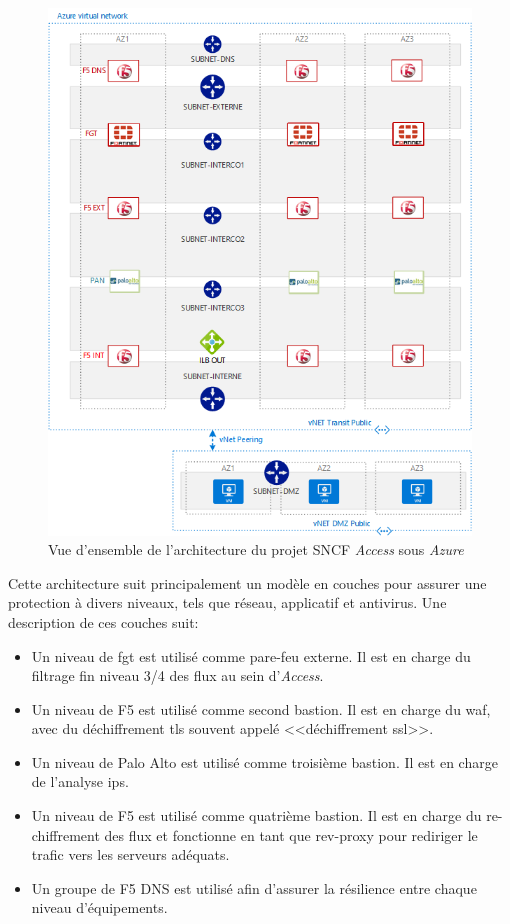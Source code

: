 \documentclass[12pt, oneside, a4paper, titlepage]{report}
\begin{document}
\begin{figure}[h!]
    \centering
    \includegraphics[width = 0.9\linewidth]{img/sncf-access/arch.png}
    \caption{%
        Vue d'ensemble de l'architecture du projet SNCF \textit{Access} sous
        \textit{Azure}%
    }%
    \label{fig:sncf-access/arch}
\end{figure}

Cette architecture suit principalement un modèle en couches pour assurer une
protection à divers niveaux, tels que réseau, applicatif et antivirus. Une
description de ces couches suit:

\begin{itemize}
    \item Un niveau de \acrlong{fgt} est utilisé comme pare-feu externe. Il est
        en charge du filtrage fin niveau 3/4 des flux au sein d'\textit{Access}.
    \item Un niveau de F5 est utilisé comme second bastion. Il est en charge du
        \gls{waf}, avec du déchiffrement \gls{tls} souvent appelé
        <<déchiffrement \gls{ssl}>>.
    \item Un niveau de Palo Alto est utilisé comme troisième bastion. Il est en
        charge de l'analyse \gls{ips}.
    \item Un niveau de F5 est utilisé comme quatrième bastion. Il est en charge
        du re-chiffrement des flux et fonctionne en tant que \gls{rev-proxy}
        pour rediriger le trafic vers les serveurs adéquats.
    \item Un groupe de F5 DNS est utilisé afin d'assurer la résilience entre
        chaque niveau d'équipements.
\end{itemize}
\end{document}
